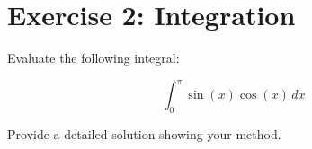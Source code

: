 \documentclass{article}
\begin{document}
\section*{Exercise 2: Integration}

Evaluate the following integral:

$$\int_0^{\pi} \sin(x) \cos(x) \, dx$$

Provide a detailed solution showing your method.
\end{document}
